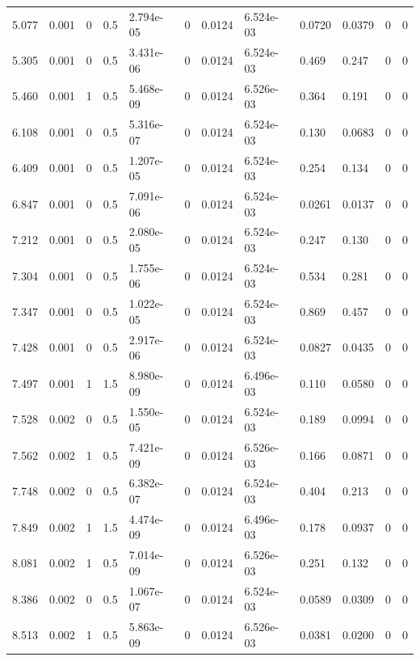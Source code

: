 \documentclass[preview]{standalone}
\begin{document}
{{\begin{tabular}{L{1.2cm}C{1.2cm} C{0.3cm}C{0.5cm} C{1.4cm}C{1.4cm} C{1.4cm}C{1.4cm} C{1.6cm}C{1.6cm} C{1.6cm}C{1.6cm}}
  5.077  &  0.001  & 0     & 0.5 &  2.794e-05  & 0  &  0.0124&   6.524e-03& 0.0720 & 0.0379   &  0 & 0  \\ 
  5.305  &  0.001  & 0     & 0.5 &  3.431e-06  & 0  &  0.0124&   6.524e-03& 0.469 & 0.247   &  0 & 0  \\ 
  5.460  &  0.001  & 1     & 0.5 &  5.468e-09  & 0  &  0.0124&   6.526e-03& 0.364 & 0.191   &  0 & 0  \\ 
  6.108  &  0.001  & 0     & 0.5 &  5.316e-07  & 0  &  0.0124&   6.524e-03& 0.130 & 0.0683   &  0 & 0  \\ 
  6.409  &  0.001  & 0     & 0.5 &  1.207e-05  & 0  &  0.0124&   6.524e-03& 0.254 & 0.134   &  0 & 0  \\ 
  6.847  &  0.001  & 0     & 0.5 &  7.091e-06  & 0  &  0.0124&   6.524e-03& 0.0261 & 0.0137   &  0 & 0  \\ 
  7.212  &  0.001  & 0     & 0.5 &  2.080e-05  & 0  &  0.0124&   6.524e-03& 0.247 & 0.130   &  0 & 0  \\ 
  7.304  &  0.001  & 0     & 0.5 &  1.755e-06  & 0  &  0.0124&   6.524e-03& 0.534 & 0.281   &  0 & 0  \\ 
  7.347  &  0.001  & 0     & 0.5 &  1.022e-05  & 0  &  0.0124&   6.524e-03& 0.869 & 0.457   &  0 & 0  \\ 
  7.428  &  0.001  & 0     & 0.5 &  2.917e-06  & 0  &  0.0124&   6.524e-03& 0.0827 & 0.0435   &  0 & 0  \\ 
  7.497  &  0.001  & 1     & 1.5 &  8.980e-09  & 0  &  0.0124&   6.496e-03& 0.110 & 0.0580   &  0 & 0  \\ 
  7.528  &  0.002  & 0     & 0.5 &  1.550e-05  & 0  &  0.0124&   6.524e-03& 0.189 & 0.0994   &  0 & 0  \\ 
  7.562  &  0.002  & 1     & 0.5 &  7.421e-09  & 0  &  0.0124&   6.526e-03& 0.166 & 0.0871   &  0 & 0  \\ 
  7.748  &  0.002  & 0     & 0.5 &  6.382e-07  & 0  &  0.0124&   6.524e-03& 0.404 & 0.213   &  0 & 0  \\ 
  7.849  &  0.002  & 1     & 1.5 &  4.474e-09  & 0  &  0.0124&   6.496e-03& 0.178 & 0.0937   &  0 & 0  \\ 
  8.081  &  0.002  & 1     & 0.5 &  7.014e-09  & 0  &  0.0124&   6.526e-03& 0.251 & 0.132   &  0 & 0  \\ 
  8.386  &  0.002  & 0     & 0.5 &  1.067e-07  & 0  &  0.0124&   6.524e-03& 0.0589 & 0.0309   &  0 & 0  \\ 
  8.513  &  0.002  & 1     & 0.5 &  5.863e-09  & 0  &  0.0124&   6.526e-03& 0.0381 & 0.0200   &  0 & 0  \\ 

\end{tabular}}}
\end{document}

